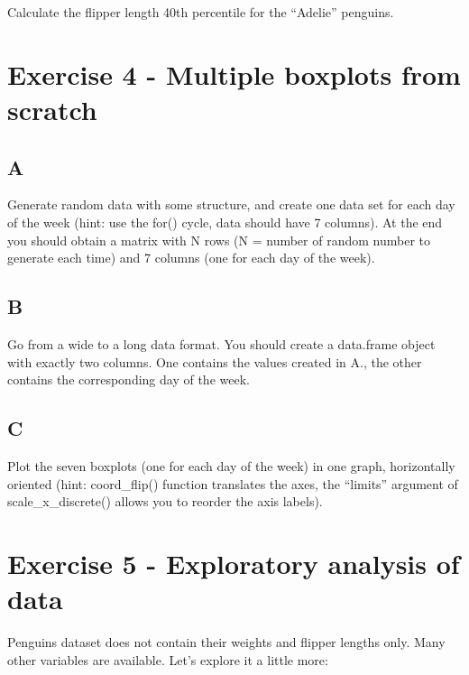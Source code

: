 \documentclass[
]{article}
\begin{document}
Calculate the flipper length 40th percentile for the ``Adelie''
penguins.

\hypertarget{exercise-4---multiple-boxplots-from-scratch}{%
\section{Exercise 4 - Multiple boxplots from
scratch}\label{exercise-4---multiple-boxplots-from-scratch}}

\hypertarget{a-3}{%
\subsection{A}\label{a-3}}

Generate random data with some structure, and create one data set for
each day of the week (hint: use the for() cycle, data should have 7
columns). At the end you should obtain a matrix with N rows (N = number
of random number to generate each time) and 7 columns (one for each day
of the week).

\hypertarget{b-3}{%
\subsection{B}\label{b-3}}

Go from a wide to a long data format. You should create a data.frame
object with exactly two columns. One contains the values created in A.,
the other contains the corresponding day of the week.

\hypertarget{c-3}{%
\subsection{C}\label{c-3}}

Plot the seven boxplots (one for each day of the week) in one graph,
horizontally oriented (hint: coord\_flip() function translates the axes,
the ``limits'' argument of scale\_x\_discrete() allows you to reorder
the axis labels).

\hypertarget{exercise-5---exploratory-analysis-of-data}{%
\section{Exercise 5 - Exploratory analysis of
data}\label{exercise-5---exploratory-analysis-of-data}}

Penguins dataset does not contain their weights and flipper lengths
only. Many other variables are available. Let's explore it a little
more:
\end{document}
